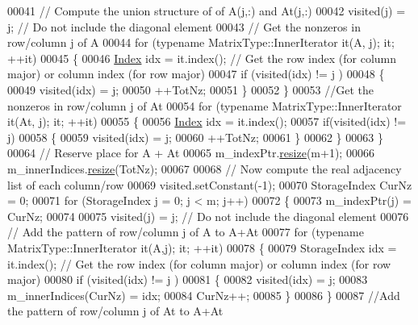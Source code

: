 \begin{DoxyCode}
00041       \textcolor{comment}{// Compute the union structure of of A(j,:) and At(j,:)}
00042       visited(j) = j; \textcolor{comment}{// Do not include the diagonal element}
00043       \textcolor{comment}{// Get the nonzeros in row/column j of A}
00044       \textcolor{keywordflow}{for} (\textcolor{keyword}{typename} MatrixType::InnerIterator it(A, j); it; ++it)
00045       \{
00046         \hyperlink{namespace_eigen_a62e77e0933482dafde8fe197d9a2cfde}{Index} idx = it.index(); \textcolor{comment}{// Get the row index (for column major) or column index (for row
       major)}
00047         \textcolor{keywordflow}{if} (visited(idx) != j ) 
00048         \{
00049           visited(idx) = j; 
00050           ++TotNz; 
00051         \}
00052       \}
00053       \textcolor{comment}{//Get the nonzeros in row/column j of At}
00054       \textcolor{keywordflow}{for} (\textcolor{keyword}{typename} MatrixType::InnerIterator it(At, j); it; ++it)
00055       \{
00056         \hyperlink{namespace_eigen_a62e77e0933482dafde8fe197d9a2cfde}{Index} idx = it.index(); 
00057         \textcolor{keywordflow}{if}(visited(idx) != j)
00058         \{
00059           visited(idx) = j; 
00060           ++TotNz; 
00061         \}
00062       \}
00063     \}
00064     \textcolor{comment}{// Reserve place for A + At}
00065     m\_indexPtr.\hyperlink{class_eigen_1_1_plain_object_base_a99d9054ee2d5a40c6e00ded0265e9cea}{resize}(m+1);
00066     m\_innerIndices.\hyperlink{class_eigen_1_1_plain_object_base_a99d9054ee2d5a40c6e00ded0265e9cea}{resize}(TotNz); 
00067 
00068     \textcolor{comment}{// Now compute the real adjacency list of each column/row }
00069     visited.setConstant(-1); 
00070     StorageIndex CurNz = 0; 
00071     \textcolor{keywordflow}{for} (StorageIndex j = 0; j < m; j++)
00072     \{
00073       m\_indexPtr(j) = CurNz; 
00074       
00075       visited(j) = j; \textcolor{comment}{// Do not include the diagonal element}
00076       \textcolor{comment}{// Add the pattern of row/column j of A to A+At}
00077       \textcolor{keywordflow}{for} (\textcolor{keyword}{typename} MatrixType::InnerIterator it(A,j); it; ++it)
00078       \{
00079         StorageIndex idx = it.index(); \textcolor{comment}{// Get the row index (for column major) or column index (for row
       major)}
00080         \textcolor{keywordflow}{if} (visited(idx) != j ) 
00081         \{
00082           visited(idx) = j; 
00083           m\_innerIndices(CurNz) = idx; 
00084           CurNz++; 
00085         \}
00086       \}
00087       \textcolor{comment}{//Add the pattern of row/column j of At to A+At}

\end{DoxyCode}
